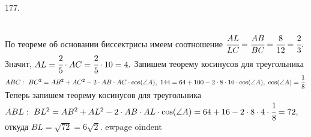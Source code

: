 177. \begin{figure}[ht!]
\end{figure}\\
По теореме об основании биссектрисы имеем соотношение $\cfrac{AL}{LC}=\cfrac{AB}{BC}=\cfrac{8}{12}=\cfrac{2}{3}.$ Значит, $AL=\cfrac{2}{5}\cdot AC=\cfrac{2}{5}\cdot10=4.$ Запишем теорему косинусов для треугольника $ABC:\ BC^2=AB^2+AC^2-2\cdot AB\cdot AC\cdot \cos(\angle A),\ 144=64+100-2\cdot8\cdot10\cdot
\cos(\angle A),\ \cos(\angle A)=\cfrac{1}{8}.$ Теперь запишем теорему косинусов для треугольника $ABL:\ BL^2=AB^2+AL^2-2\cdot AB\cdot AL\cdot \cos(\angle A)=
64+16-2\cdot8\cdot4\cdot\cfrac{1}{8}=72,$ откуда $BL=\sqrt{72}=6\sqrt{2}.$
ewpage
oindent
